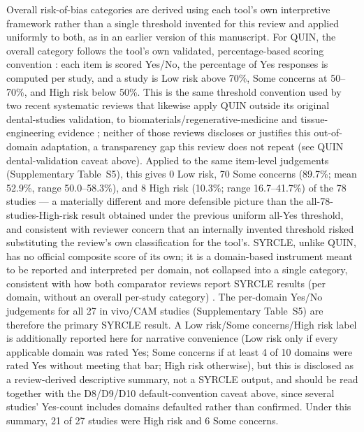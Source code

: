 \documentclass[5p,times,twocolumn]{elsarticle}
\begin{document}
Overall risk-of-bias categories are derived using each tool's own interpretive framework rather than a single threshold invented for this review and applied uniformly to both, as in an earlier version of this manuscript. For QUIN, the overall category follows the tool's own validated, percentage-based scoring convention \cite{ref84}: each item is scored Yes/No, the percentage of Yes responses is computed per study, and a study is Low risk above 70\%, Some concerns at 50--70\%, and High risk below 50\%. This is the same threshold convention used by two recent systematic reviews that likewise apply QUIN outside its original dental-studies validation, to biomaterials/regenerative-medicine and tissue-engineering evidence \cite{ref90,ref91}; neither of those reviews discloses or justifies this out-of-domain adaptation, a transparency gap this review does not repeat (see QUIN dental-validation caveat above). Applied to the same item-level judgements (Supplementary Table~S5), this gives 0 Low risk, 70 Some concerns (89.7\%; mean 52.9\%, range 50.0--58.3\%), and 8 High risk (10.3\%; range 16.7--41.7\%) of the 78 studies --- a materially different and more defensible picture than the all-78-studies-High-risk result obtained under the previous uniform all-Yes threshold, and consistent with reviewer concern that an internally invented threshold risked substituting the review's own classification for the tool's. SYRCLE, unlike QUIN, has no official composite score of its own; it is a domain-based instrument meant to be reported and interpreted per domain, not collapsed into a single category, consistent with how both comparator reviews report SYRCLE results (per domain, without an overall per-study category) \cite{ref90,ref91}. The per-domain Yes/No judgements for all 27 in vivo/CAM studies (Supplementary Table~S5) are therefore the primary SYRCLE result. A Low risk/Some concerns/High risk label is additionally reported here for narrative convenience (Low risk only if every applicable domain was rated Yes; Some concerns if at least 4 of 10 domains were rated Yes without meeting that bar; High risk otherwise), but this is disclosed as a review-derived descriptive summary, not a SYRCLE output, and should be read together with the D8/D9/D10 default-convention caveat above, since several studies' Yes-count includes domains defaulted rather than confirmed. Under this summary, 21 of 27 studies were High risk and 6 Some concerns.
\end{document}
